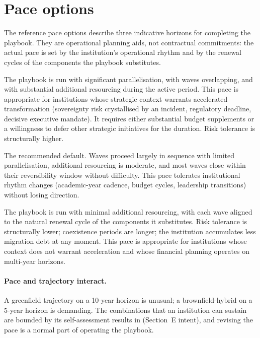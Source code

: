 \section{Pace options}
\label{sec:pr-pace}

The reference pace options describe three indicative horizons for
completing the playbook. They are operational planning aids, not
contractual commitments: the actual pace is set by the institution's
operational rhythm and by the renewal cycles of the components the
playbook substitutes.

\begin{description}[leftmargin=1.5em,style=nextline,nosep]
  \item[5-year compressed.] The playbook is run with significant
    parallelisation, with waves overlapping, and with substantial
    additional resourcing during the active period. This pace is
    appropriate for institutions whose strategic context warrants
    accelerated transformation (sovereignty risk crystallised by an
    incident, regulatory deadline, decisive executive mandate). It
    requires either substantial budget supplements or a willingness
    to defer other strategic initiatives for the duration. Risk
    tolerance is structurally higher.
  \item[7-year balanced.] The recommended default. Waves proceed
    largely in sequence with limited parallelisation, additional
    resourcing is moderate, and most waves close within their
    reversibility window without difficulty. This pace tolerates
    institutional rhythm changes (academic-year cadence, budget
    cycles, leadership transitions) without losing direction.
  \item[10-year gradual.] The playbook is run with minimal
    additional resourcing, with each wave aligned to the natural
    renewal cycle of the components it substitutes. Risk tolerance
    is structurally lower; coexistence periods are longer; the
    institution accumulates less migration debt at any moment.
    This pace is appropriate for institutions whose context does
    not warrant acceleration and whose financial planning operates
    on multi-year horizons.
\end{description}

\paragraph{Pace and trajectory interact.} A greenfield trajectory
on a 10-year horizon is unusual; a brownfield-hybrid on a 5-year
horizon is demanding. The combinations that an institution can
sustain are bounded by its self-assessment results in
 (Section~E intent), and revising the
pace is a normal part of operating the playbook.

